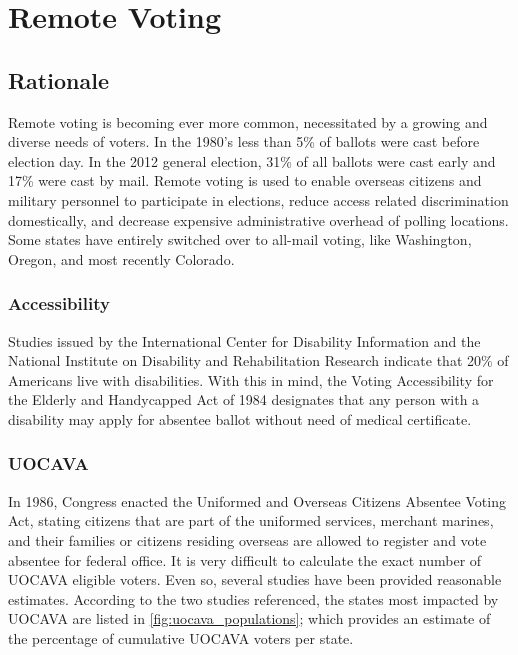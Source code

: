 \chapter{Remote Voting}
\label{chapter:remote_voting}

\section{Rationale}
Remote voting is becoming ever more common, necessitated by a growing and
diverse needs of voters. In the 1980's less than 5\% of ballots were cast
before election day. In the 2012 general election, 31\% of all ballots were
cast early and 17\% were cast by mail. Remote voting is used to enable
overseas citizens and military personnel to participate in elections,
reduce access related discrimination domestically, and decrease expensive
administrative overhead of polling locations. Some states have entirely
switched over to all-mail voting, like Washington, Oregon, and most
recently Colorado.

\subsection{Accessibility}
Studies issued by the International Center for Disability Information and the
National Institute on Disability and Rehabilitation Research indicate that 20\%
of Americans live with disabilities. With this in mind, the Voting
Accessibility for the Elderly and Handycapped Act of 1984 designates that any
person with a disability may apply for absentee ballot without need of medical
certificate.


\subsection{UOCAVA}
In 1986, Congress enacted the Uniformed and Overseas Citizens Absentee Voting
Act, stating citizens that are part of the uniformed services, merchant
marines, and their families or citizens residing overseas are allowed to
register and vote absentee for federal office. It is very difficult to
calculate the exact number of UOCAVA eligible voters. Even so, several
studies have been provided reasonable estimates. According to the two studies
referenced, the states most impacted by UOCAVA are listed in
\autoref{fig:uocava_populations}; which provides an estimate of the percentage
of cumulative UOCAVA voters per state.

